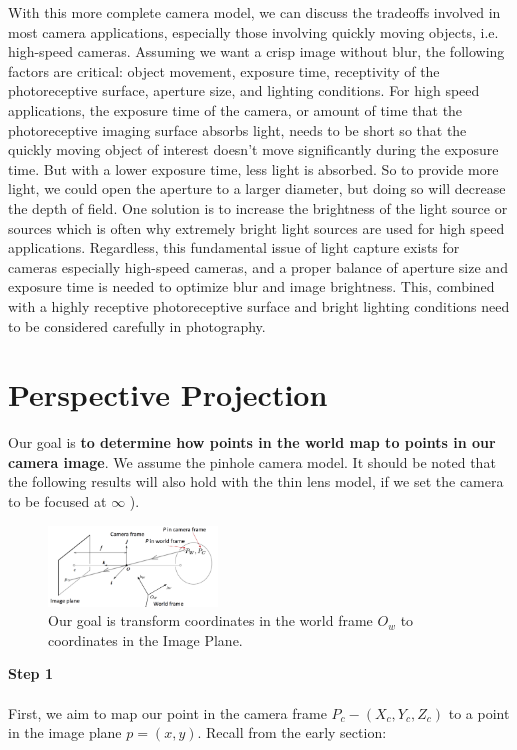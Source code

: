 \documentclass[]{article}
\begin{document}
With this more complete camera model, we can discuss the tradeoffs involved in most camera applications, especially those involving quickly moving objects, i.e. high-speed cameras. Assuming we want a crisp image without blur, the following factors are critical: object movement, exposure time, receptivity of the photoreceptive surface, aperture size, and lighting conditions. For high speed applications, the exposure time of the camera, or amount of time that the photoreceptive imaging surface absorbs light, needs to be short so that the quickly moving object of interest doesn't move significantly during the exposure time. But with a lower exposure time, less light is absorbed. So to provide more light, we could open the aperture to a larger diameter, but doing so will decrease the depth of field. One solution is to increase the brightness of the light source or sources which is often why extremely bright light sources are used for high speed applications. Regardless, this fundamental issue of light capture exists for cameras especially high-speed cameras, and a proper balance of aperture size and exposure time is needed to optimize blur and image brightness. This, combined with a highly receptive photoreceptive surface and bright lighting conditions need to be considered carefully in photography.


\section{Perspective Projection}
Our goal is \textbf{to determine how points in the world map to points in our camera image}. We assume the pinhole camera model. It should be noted that the following results will also hold with the thin lens model, if we set the camera to be focused at $\infty$ ).

\begin{figure}[H]
\includegraphics[width=0.4\textwidth]{diagram_1_vik.png}
\centering
\caption{Our goal is transform coordinates in the world frame $O_w$ to coordinates in the Image Plane. }
\label{fig:pinhole_cam}
\end{figure}

\textbf{Step 1}\\\\
First, we aim to map our point in the camera frame $P_c-(X_c, Y_c, Z_c)$ to a point in the image plane $p=(x,y)$. Recall from the early section:
\end{document}
